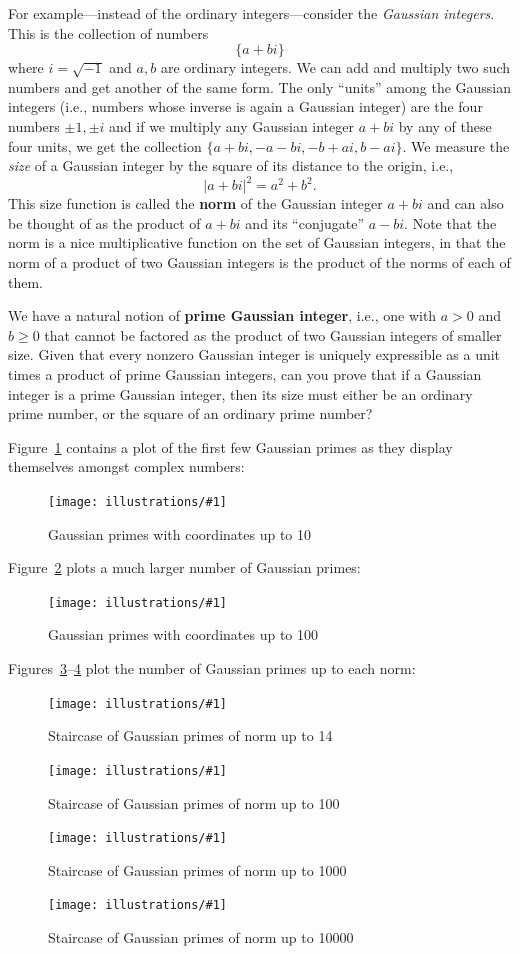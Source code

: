 \documentclass[openany]{book}
\newcommand{\ill}[3]{%
   \begin{figure}[H]%
   \vspace{-2ex}
   \centering%
   \texttt{[image: illustrations/\#1]}%
   \caption{#3}%
   \vspace{-2ex}
    \end{figure}}
\theoremstyle{plain}
\theoremstyle{definition}
\begin{document}
{{For example---instead of the ordinary integers---consider the {\it
  Gaussian integers}. This is the collection of numbers
 $$ \{ a+bi\}$$
 where $i = {\sqrt{-1}}$ and $a,b$ are ordinary integers. We can add
 and multiply two such numbers and get another of the same form. The
 only ``units'' among the Gaussian integers (i.e., numbers whose
 inverse is again a Gaussian integer) are the four numbers $\pm 1, \pm
 i$ and if we multiply any Gaussian integer $a+bi$ by any of these
 four units, we get the collection $\{a+bi, -a-bi, -b+ai, b -ai\}$.
 We measure the {\it size} of a Gaussian integer by the square of its
 distance to the origin, i.e., $$|a+bi|^2 = {a^2+b^2}.$$   This size function  is called the {\bf norm} of the Gaussian integer $a+bi$ and can also be thought of as  the product of $a+bi$ and its ``conjugate'' $a-bi$.   Note that
 the norm is a nice multiplicative function on the set of Gaussian
 integers, in that the norm of a product of two Gaussian integers is
 the product of the norms of each of them.

 We have a natural notion of {\bf prime Gaussian integer}, i.e., one
 with $a>0$ and $b\geq 0$ that cannot be factored as the product of
 two Gaussian integers of smaller size.
 Given that every nonzero Gaussian integer is uniquely expressible as a unit times a product of prime Gaussian integers, can you prove that if a Gaussian integer is a prime
 Gaussian integer, then its size must either be an ordinary prime
 number, or the square of an ordinary prime number?

Figure~\ref{fig:gaussian-10} contains a plot of the first few Gaussian
primes as they display themselves amongst complex numbers:

\ill{gaussian_primes-10}{.8}{Gaussian primes with coordinates up to 10\label{fig:gaussian-10}}

Figure~\ref{fig:gaussian-100} plots a much larger number of Gaussian primes:

\ill{gaussian_primes-100}{1}{Gaussian primes with coordinates up to 100\label{fig:gaussian-100}}

Figures~\ref{fig:gaussian-staircase-14}--\ref{fig:gaussian-staircase-10000} plot the number
of Gaussian primes up to each norm:

\ill{gaussian_staircase_14}{.8}{Staircase of Gaussian primes of norm up to 14\label{fig:gaussian-staircase-14}}
\ill{gaussian_staircase_100}{.8}{Staircase of Gaussian primes of norm up to 100}
\ill{gaussian_staircase_1000}{.8}{Staircase of Gaussian primes of norm up to 1000}
\ill{gaussian_staircase_10000}{.8}{Staircase of Gaussian primes of norm up to 10000\label{fig:gaussian-staircase-10000}}

}}
\end{document}
